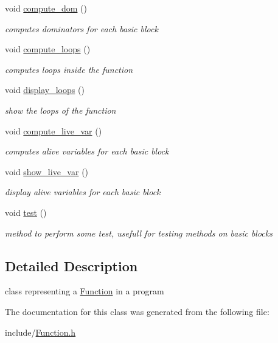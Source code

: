 \begin{DoxyCompactItemize}
void \mbox{\hyperlink{class_function_a9ecf8e774164937c3dfdb989ebe1c866}{compute\+\_\+dom}} ()
\begin{DoxyCompactList}\small\item\em computes dominators for each basic block \end{DoxyCompactList}\item 
\mbox{\label{class_function_a20c7a6df3cb39a134fe5dcc9749bdf2e}} 
void \mbox{\hyperlink{class_function_a20c7a6df3cb39a134fe5dcc9749bdf2e}{compute\+\_\+loops}} ()
\begin{DoxyCompactList}\small\item\em computes loops inside the function \end{DoxyCompactList}\item 
\mbox{\label{class_function_a93ab02fb20a2d5d573f930a111db84f5}} 
void \mbox{\hyperlink{class_function_a93ab02fb20a2d5d573f930a111db84f5}{display\+\_\+loops}} ()
\begin{DoxyCompactList}\small\item\em show the loops of the function \end{DoxyCompactList}\item 
\mbox{\label{class_function_a21b614fb69692ba00240831c8fe8beb9}} 
void \mbox{\hyperlink{class_function_a21b614fb69692ba00240831c8fe8beb9}{compute\+\_\+live\+\_\+var}} ()
\begin{DoxyCompactList}\small\item\em computes alive variables for each basic block \end{DoxyCompactList}\item 
\mbox{\label{class_function_a970520528e3f91736849ca773d6e6bff}} 
void \mbox{\hyperlink{class_function_a970520528e3f91736849ca773d6e6bff}{show\+\_\+live\+\_\+var}} ()
\begin{DoxyCompactList}\small\item\em display alive variables for each basic block \end{DoxyCompactList}\item 
\mbox{\label{class_function_aaa0d06640a5075c416106a88bd9a833a}} 
void \mbox{\hyperlink{class_function_aaa0d06640a5075c416106a88bd9a833a}{test}} ()
\begin{DoxyCompactList}\small\item\em method to perform some test, usefull for testing methods on basic blocks \end{DoxyCompactList}\end{DoxyCompactItemize}


\subsection{Detailed Description}
class representing a \mbox{\hyperlink{class_function}{Function}} in a program 

The documentation for this class was generated from the following file\+:\begin{DoxyCompactItemize}
\item 
include/\mbox{\hyperlink{_function_8h}{Function.\+h}}\end{DoxyCompactItemize}
